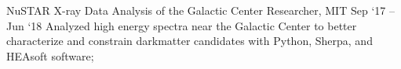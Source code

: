 \experience
    {NuSTAR X-ray Data Analysis of the Galactic Center}
    {Researcher, MIT}
    {Sep `17 -- Jun `18}
    {
        Analyzed high energy spectra near the Galactic Center to better characterize and
        constrain darkmatter candidates with Python, Sherpa, and HEAsoft software;
    }
